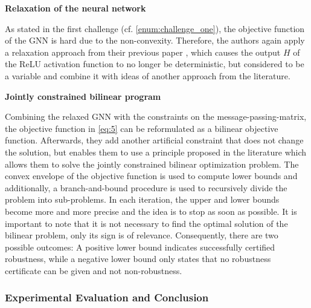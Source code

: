 \documentclass[a4paper,preprint]{sig-alternate}
\begin{document}
\textbf{Relaxation of the neural network}\newline

As stated in the first challenge (cf. \ref{enum:challenge_one}), the objective function of the GNN is hard due to the non-convexity.
Therefore, the authors again apply a relaxation approach from their previous paper \cite{Zuegner_2019}, which causes the output $H$ 
of the ReLU activation function to no longer be deterministic, but considered to be a variable and combine it with ideas
of another approach from the literature.\newline

\textbf{Jointly constrained bilinear program}\newline

Combining the relaxed GNN with the constraints on the message-passing-matrix, the objective function in \ref{eq:5} 
can be reformulated as a bilinear objective function. \cite{10.1145/3394486.3403217}
Afterwards, they add another artificial constraint that does not change the solution, but enables them to use 
a principle proposed in the literature which allows them to solve the jointly constrained bilinear optimization problem.
The convex envelope of the objective function is used to compute lower bounds and additionally, a branch-and-bound procedure is used
to recursively divide the problem into sub-problems. In each iteration, the upper and lower bounds become more and more precise
and the idea is to stop as soon as possible. It is important to note that it is not necessary to find the optimal solution of 
the bilinear problem, only its sign is of relevance. \cite{10.1145/3394486.3403217}
Consequently, there are two possible outcomes: A positive lower bound indicates successfully certified robustness, while a negative
lower bound only states that no robustness certificate can be given and not non-robustness. \cite{10.1145/3394486.3403217}\newline

\subsubsection{Experimental Evaluation and Conclusion}
\end{document}
